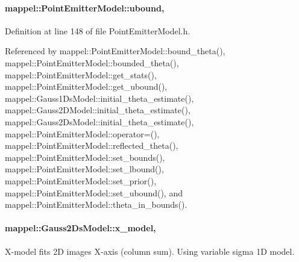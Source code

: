 \paragraph[{\texorpdfstring{ubound}{ubound}}]{ mappel\+::\+Point\+Emitter\+Model\+::ubound\hspace{0.3cm}{\ttfamily [protected]}, {\ttfamily [inherited]}}\hypertarget{classmappel_1_1PointEmitterModel_a35b883e84b6a2e0093bdf482c623beef}{}\label{classmappel_1_1PointEmitterModel_a35b883e84b6a2e0093bdf482c623beef}


Definition at line 148 of file Point\+Emitter\+Model.\+h.



Referenced by mappel\+::\+Point\+Emitter\+Model\+::bound\+\_\+theta(), mappel\+::\+Point\+Emitter\+Model\+::bounded\+\_\+theta(), mappel\+::\+Point\+Emitter\+Model\+::get\+\_\+stats(), mappel\+::\+Point\+Emitter\+Model\+::get\+\_\+ubound(), mappel\+::\+Gauss1\+Ds\+Model\+::initial\+\_\+theta\+\_\+estimate(), mappel\+::\+Gauss2\+D\+Model\+::initial\+\_\+theta\+\_\+estimate(), mappel\+::\+Gauss2\+Ds\+Model\+::initial\+\_\+theta\+\_\+estimate(), mappel\+::\+Point\+Emitter\+Model\+::operator=(), mappel\+::\+Point\+Emitter\+Model\+::reflected\+\_\+theta(), mappel\+::\+Point\+Emitter\+Model\+::set\+\_\+bounds(), mappel\+::\+Point\+Emitter\+Model\+::set\+\_\+lbound(), mappel\+::\+Point\+Emitter\+Model\+::set\+\_\+prior(), mappel\+::\+Point\+Emitter\+Model\+::set\+\_\+ubound(), and mappel\+::\+Point\+Emitter\+Model\+::theta\+\_\+in\+\_\+bounds().

\paragraph[{\texorpdfstring{x\+\_\+model}{x_model}}]{ mappel\+::\+Gauss2\+Ds\+Model\+::x\+\_\+model\hspace{0.3cm}{\ttfamily [protected]}, {\ttfamily [inherited]}}\hypertarget{classmappel_1_1Gauss2DsModel_ab2b2238d5213b2de85897bc60d5dcc4d}{}\label{classmappel_1_1Gauss2DsModel_ab2b2238d5213b2de85897bc60d5dcc4d}
X-\/model fits 2D images X-\/axis (column sum). Using variable sigma 1D model. 

